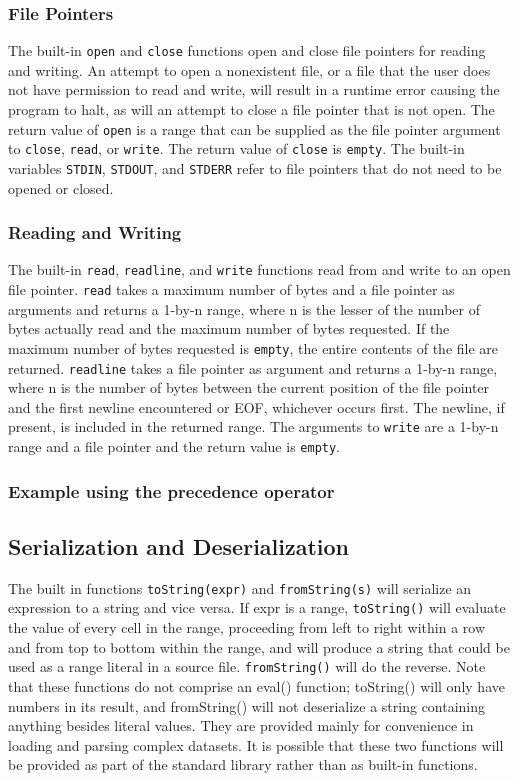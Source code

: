 \subsubsection{File Pointers}
The built-in \texttt{open} and \texttt{close} functions open and close file pointers for reading and writing. An attempt to open a nonexistent file, or a file that the user does not have permission to read and write, will result in a runtime error causing the program to halt, as will an attempt to close a file pointer that is not open. The return value of \texttt{open} is a range that can be supplied as the file pointer argument to \texttt{close}, \texttt{read}, or \texttt{write}. The return value of \texttt{close} is \texttt{empty}. The built-in variables \texttt{STDIN}, \texttt{STDOUT}, and \texttt{STDERR} refer to file pointers that do not need to be opened or closed.
\subsubsection{Reading and Writing}
The built-in \texttt{read}, \texttt{readline}, and \texttt{write} functions read from and write to an open file pointer.  \texttt{read} takes a maximum number of bytes and a file pointer as arguments and returns a 1-by-n range, where n is the lesser of the number of bytes actually read and the maximum number of bytes requested. If the maximum number of bytes requested is \texttt{empty}, the entire contents of the file are returned. \texttt{readline} takes a file pointer as argument and returns a 1-by-n range, where n is the number of bytes between the current position of the file pointer and the first newline encountered or EOF, whichever occurs first. The newline, if present, is included in the returned range. The arguments to \texttt{write} are a 1-by-n range and a file pointer and the return value is \texttt{empty}.
\subsubsection{Example using the precedence operator}

\subsection{Serialization and Deserialization}
The built in functions \texttt{toString(expr)} and \texttt{fromString(s)} will serialize an expression to a string and vice versa. If expr is a range, \texttt{toString()} will evaluate the value of every cell in the range, proceeding from left to right within a row and from top to bottom within the range, and will produce a string that could be used as a range literal in a source file. \texttt{fromString()} will do the reverse. Note that these functions do not comprise an eval() function; toString() will only have numbers in its result, and fromString() will not deserialize a string containing anything besides literal values. They are provided mainly for convenience in loading and parsing complex datasets. It is possible that these two functions will be provided as part of the standard library rather than as built-in functions.
